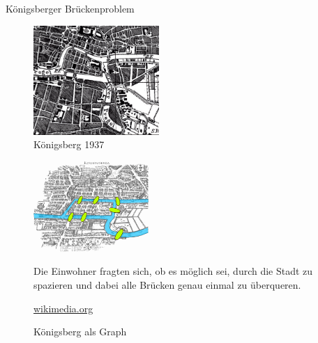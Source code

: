 \documentclass[18pt]{beamer}
\begin{document}
    \begin{frame}[allowframebreaks]{Königsberger Brückenproblem}
        \begin{figure}
            \centering
            \includegraphics[keepaspectratio,width=180px]{figures/Konigsberg_Brucken_BKG.png}
            \caption{Königsberg 1937 \cite{bkg_kon}}
        \end{figure}

        \framebreak

        \begin{figure}
            \centering
            \includegraphics[keepaspectratio,height=130px]{figures/Konigsberg_bridges.png}
            \caption{\tiny \url{wikimedia.org}}
            \glqq Die Einwohner fragten sich, ob es möglich sei, durch die Stadt zu spazieren und dabei alle Brücken genau einmal zu überqueren.\grqq
        \end{figure}
    \end{frame}

    \begin{frame}{}
        \begin{figure}[]
            \centering
            \caption{Königsberg als Graph}
        \end{figure}  
    \end{frame}
\end{document}
